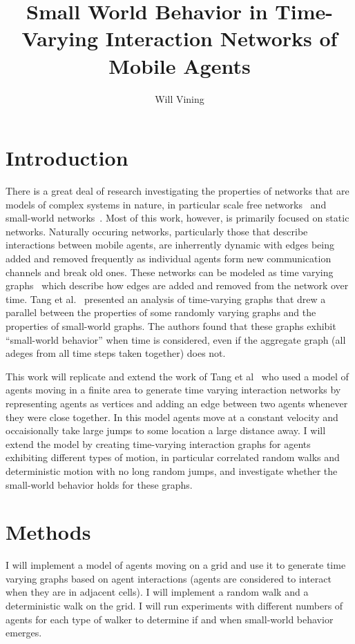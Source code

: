 \documentclass{article}
\title{Small World Behavior in Time-Varying Interaction Networks of
  Mobile Agents}
\author{Will Vining}
\begin{document}
\maketitle
\section{Introduction}
There is a great deal of research investigating the properties of
networks that are models of complex systems in nature, in particular
scale free networks~\cite{Barabasi1999} and small-world
networks~\cite{Watts1998}. Most of this work, however, is primarily
focused on static networks. Naturally occuring networks, particularly
those that describe interactions between mobile agents, are
inherrently dynamic with edges being added and removed frequently as
individual agents form new communication channels and break old
ones. These networks can be modeled as time varying
graphs~\cite{Casteigts2012,Tang2010} which describe how edges are
added and removed from the network over time. Tang et
al.~\cite{Tang2010} presented an analysis of time-varying graphs that
drew a parallel between the properties of some randomly varying graphs
and the properties of small-world graphs. The authors found that these
graphs exhibit ``small-world behavior'' when time is considered, even
if the aggregate graph (all adeges from all time steps taken together)
does not.

This work will replicate and extend the work of Tang et
al~\cite{Tang2010} who used a model of agents moving in a finite area
to generate time varying interaction networks by representing agents
as vertices and adding an edge between two agents whenever they were
close together. In this model agents move at a constant velocity and
occaisionally take large jumps to some location a large distance
away. I will extend the model by creating time-varying interaction
graphs for agents exhibiting different types of motion, in particular
correlated random walks and deterministic motion with no long random
jumps, and investigate whether the small-world behavior holds for
these graphs.


\section{Methods}
I will implement a model of agents moving on a grid and use it to
generate time varying graphs based on agent interactions (agents are
considered to interact when they are in adjacent cells). I will
implement a random walk and a deterministic walk on the grid. I will
run experiments with different numbers of agents for each type of
walker to determine if and when small-world behavior emerges.

{}

\end{document}
